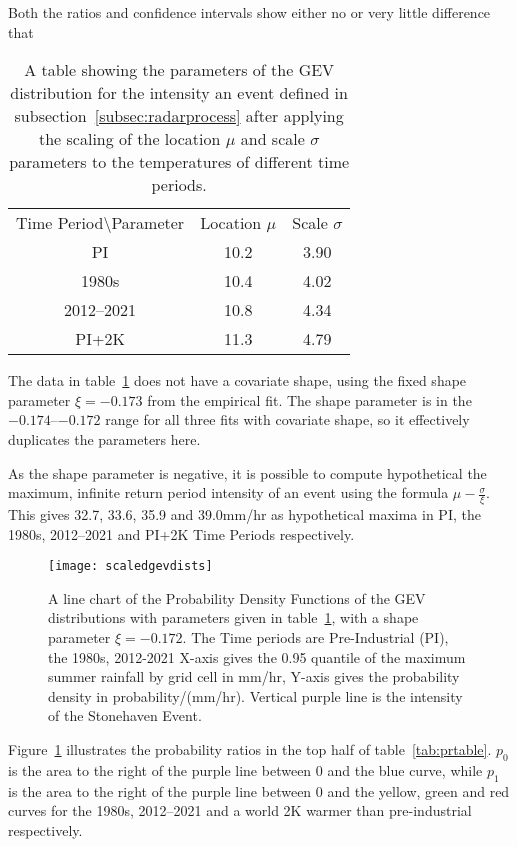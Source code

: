 Both the ratios and confidence intervals show either no or very little difference that

\begin{table}[H]
    \centering
    \begin{tabular}{c c c}
        Time Period\textbackslash Parameter & Location $\mu$ & Scale $\sigma$ \\
        PI & 10.2 & 3.90 \\
        1980s & 10.4 & 4.02 \\
        2012--2021 & 10.8 & 4.34 \\
        PI+2K & 11.3 & 4.79
    \end{tabular}
    \caption{A table showing the parameters of the GEV distribution for the intensity an event defined in subsection~\ref{subsec:radarprocess} after
        applying the scaling of the location $\mu$ and scale $\sigma$ parameters to the temperatures of different time periods.}
    \label{tab:0.95params}
\end{table}

The data in table~\ref{tab:0.95params} does not have a covariate shape,
    using the fixed shape parameter $\xi = -0.173$ from the empirical fit.
The shape parameter is in the $-0.174$--$-0.172$ range for all three fits with covariate shape,
    so it effectively duplicates the parameters here.

As the shape parameter is negative,
    it is possible to compute hypothetical the maximum,
    infinite return period intensity of an event using the formula $\mu - \frac{\sigma}{\xi}$.
This gives 32.7, 33.6, 35.9 and 39.0mm/hr as hypothetical maxima in
    PI, the 1980s, 2012--2021 and PI+2K Time Periods respectively.

\begin{figure}[H]
    \centering
    \texttt{[image: scaledgevdists]}
    \caption{A line chart of the Probability Density Functions of the GEV distributions with parameters given in table~\ref{tab:0.95params},
        with a shape parameter $\xi = -0.172$.
    The Time periods are Pre-Industrial (PI), the 1980s, 2012-2021
    X-axis gives the 0.95 quantile of the maximum summer rainfall by grid cell in mm/hr,
        Y-axis gives the probability density in probability/(mm/hr).
    Vertical purple line is the intensity of the Stonehaven Event.}
    \label{fig:scaledgevdists}
\end{figure}

Figure~\ref{fig:scaledgevdists} illustrates the probability ratios in the top half of table~\ref{tab:prtable}.
$p_0$ is the area to the right of the purple line between 0 and the blue curve,
    while $p_1$ is the area to the right of the purple line between 0 and the yellow, green and red curves for
    the 1980s, 2012--2021 and a world 2K warmer than pre-industrial respectively.


